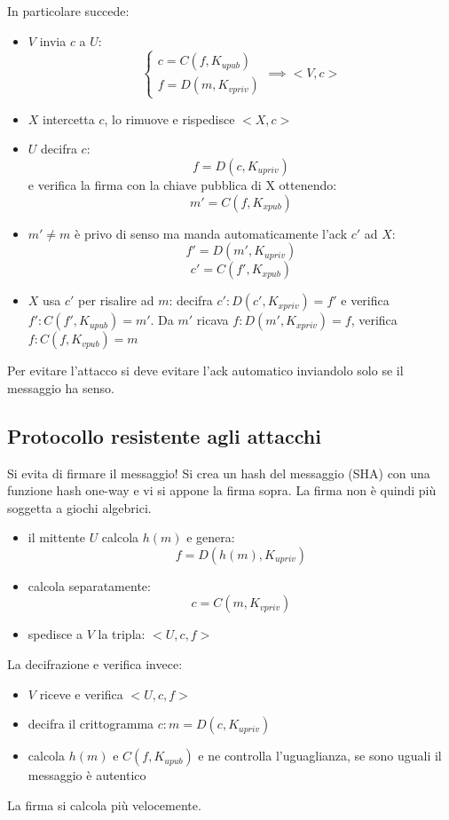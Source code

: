In particolare succede:
\begin{itemize}
    \item $V$ invia $c$ a $U$:
        \begin{equation}
            \begin{cases}
                c = C(f, K_{upub}) \\
                f = D(m, K_{vpriv})
            \end{cases}
            \implies <V,c>
        \end{equation}
    \item $X$ intercetta $c$, lo rimuove e rispedisce $<X,c>$
    \item $U$ decifra $c$:
    $$ f = D(c, K_{upriv}) $$
    e verifica la firma con la chiave pubblica di X ottenendo:
    $$ m' = C(f, K_{xpub}) $$
    \item $m' \neq m$ è privo di senso ma manda automaticamente l'ack $c'$ ad $X$:
    $$ f' = D(m', K_{upriv}) $$
    $$ c' = C(f', K_{xpub}) $$
    \item $X$ usa $c'$ per risalire ad $m$: decifra $c': D(c', K_{xpriv}) = f'$ e verifica $f': C(f', K_{upub}) = m'$. Da $m'$ ricava $f: D(m', K_{xpriv})=f$, verifica $f: C(f, K_{vpub}) = m$
\end{itemize}

Per evitare l'attacco si deve evitare l'ack automatico inviandolo solo se il messaggio ha senso.

\subsection{Protocollo resistente agli attacchi}
Si evita di firmare il messaggio!
Si crea un hash del messaggio (SHA) con una funzione hash one-way e vi si appone la firma sopra.
La firma non è quindi più soggetta a giochi algebrici.
\begin{itemize}
    \item il mittente $U$ calcola $h(m)$ e genera:
    $$ f = D(h(m), K_{upriv})$$
    \item calcola separatamente:
    $$ c = C(m, K_{vpriv}) $$
    \item spedisce a $V$ la tripla: $<U, c, f>$
\end{itemize}

La decifrazione e verifica invece:
\begin{itemize}
    \item $V$ riceve e verifica $<U, c, f>$
    \item decifra il crittogramma $c: m = D(c, K_{upriv})$
    \item calcola $h(m)$ e $C(f, K_{upub})$ e ne controlla l'uguaglianza, se sono uguali il messaggio è autentico
\end{itemize}
La firma si calcola più velocemente.

